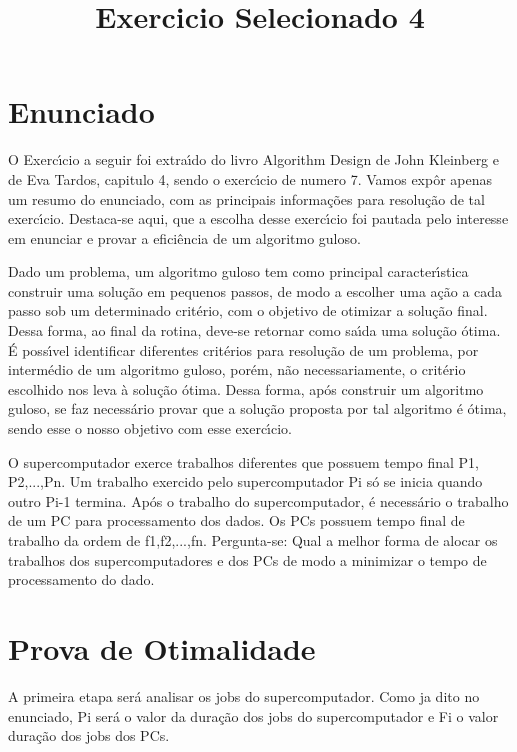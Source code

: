 \documentclass{article}
\begin{document}

\title{Exercicio Selecionado 4}


\section{Enunciado}

O Exerc\'{\i}cio a seguir foi extra\'{\i}do do livro Algorithm Design de John Kleinberg e de Eva Tardos,
capitulo 4, sendo o exerc\'{\i}cio de numero 7. Vamos exp\^or apenas um resumo do enunciado, com as principais
informa\c{c}\~oes para resolu\c{c}\~ao de tal exerc\'{\i}cio. Destaca-se aqui, que a escolha desse exerc\'{\i}cio foi
pautada pelo interesse em enunciar e provar a efici\^encia de um algoritmo guloso.

Dado um problema, um algoritmo guloso tem como principal caracter\'{\i}stica construir uma solu\c{c}\~ao
em pequenos passos, de modo a escolher uma a\c{c}\~ao a cada passo sob um determinado crit\'erio, com o
objetivo de otimizar a solu\c{c}\~ao final. Dessa forma, ao final da rotina, deve-se retornar como sa\'{\i}da uma solu\c{c}\~ao \'otima.
\'E poss\'{\i}vel identificar diferentes crit\'erios para resolu\c{c}\~ao de um problema, por interm\'edio de um algoritmo guloso, por\'em,
n\~ao necessariamente, o crit\'erio escolhido nos leva \`a solu\c{c}\~ao \'otima. Dessa forma, ap\'os construir um algoritmo guloso,
se faz necess\'ario provar que a solu\c{c}\~ao proposta por tal algoritmo \'e \'otima, sendo esse o nosso objetivo com esse exerc\'{\i}cio.

O supercomputador exerce trabalhos diferentes que possuem tempo final P1, P2,...,Pn.
Um trabalho exercido pelo supercomputador Pi s\'o se inicia quando outro Pi-1 termina.
Ap\'os o trabalho do supercomputador, \'e necess\'ario o trabalho de um PC para processamento
dos dados. Os PCs possuem tempo final de trabalho da ordem de f1,f2,...,fn. Pergunta-se: Qual
a melhor forma de alocar os trabalhos dos supercomputadores e dos PCs de modo a minimizar o
tempo de processamento do dado.

\section{Prova de Otimalidade}
A primeira etapa ser\'a analisar os jobs do supercomputador. Como ja dito no enunciado, Pi
ser\'a o valor da dura\c{c}\~ao dos jobs do supercomputador e Fi o valor dura\c{c}\~ao dos jobs dos PCs.
\end{document}
